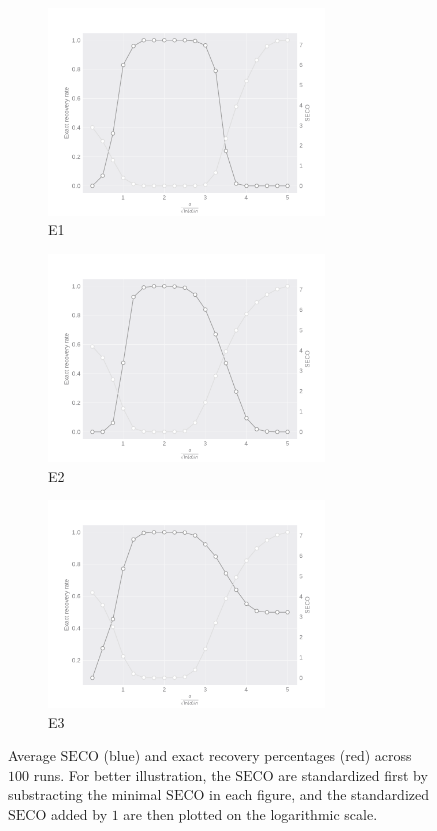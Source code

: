 \documentclass[11pt]{article}
\newcommand{\SECO}{\mathrm{SECO}}
\theoremstyle{definition}
\begin{document}
\begin{figure}[!htp]
                \begin{subfigure}{.33\textwidth}
                  \centering
                  \includegraphics[width=.9\linewidth,height=5.5cm]{figure/model_1CV.pdf}
                  \caption{E1}
                  \label{fig:sfig_cv1}
                \end{subfigure}%
                \begin{subfigure}{.33\textwidth}
                  \centering
                  \includegraphics[width=.9\linewidth,height=5.5cm]{figure/model_2CV.pdf}
                  \caption{E2}
                  \label{fig:sfig_cv2}
                \end{subfigure}
                \begin{subfigure}{.33\textwidth}
                  \centering
                  \includegraphics[width=.9\linewidth,height=5.5cm]{figure/model_3CV.pdf}
                  \caption{E3}
                  \label{fig:sfig_cv3}
                \end{subfigure}%
                \hspace{\fill}
    	\caption{Average $\SECO$ (blue) and exact recovery percentages (red) across $100$ runs. For better illustration, the $\SECO$ are standardized first by substracting the minimal $\SECO$ in each figure, and the standardized $\SECO$ added by $1$ are then plotted on the logarithmic scale.}
    	\label{fig:cv}
	\end{figure}
	 
\end{document}

